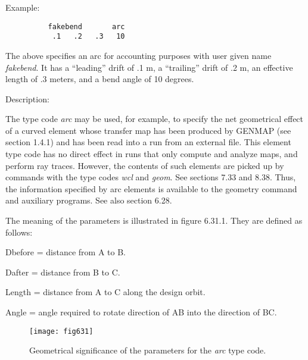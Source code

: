 \vspace{5mm}
     Example:
\begin{verbatim}
          fakebend       arc
           .1   .2   .3   10
\end{verbatim}

The above specifies an arc for accounting purposes with user given name
{\em fakebend}.  It has a ``leading'' drift of .1 m, a ``trailing'' drift
of .2 m, an effective length of .3 meters, and a bend angle of 10
degrees.

\vspace{5mm}
     Description:
\vspace{2mm}

The type code {\em arc} may be used, for example, to specify
the net geometrical effect of a curved element whose transfer map has
been produced by GENMAP (see section 1.4.1) and has been read into a
\Mary run from an external file.  This element type code has no direct effect
in \Mary runs that only compute and analyze maps, and perform ray
traces.  However, the contents of such elements are picked up by commands
with the type codes {\em wcl} and {\em geom}.  See sections 7.33 and
8.38.  Thus, the information specified by arc elements is available to the geometry
command and auxiliary programs.  See also section 6.28.

The meaning of the parameters is illustrated in figure 6.31.1.  They are
defined as follows:

\vspace{.25in}
Dbefore = distance from A to B.

\vspace{.25in}
Dafter = distance from B to C.

\vspace{.25in}
Length = distance from A to C along the design orbit.

\vspace{.25in}
Angle = angle required to rotate direction of AB into the direction of BC.

\begin{figure}[htp]

\vspace{2.5in}
  \centering
  \texttt{[image: fig631]}
  \caption{Geometrical significance of the parameters for the {\em arc}
type code.}
\end{figure}
